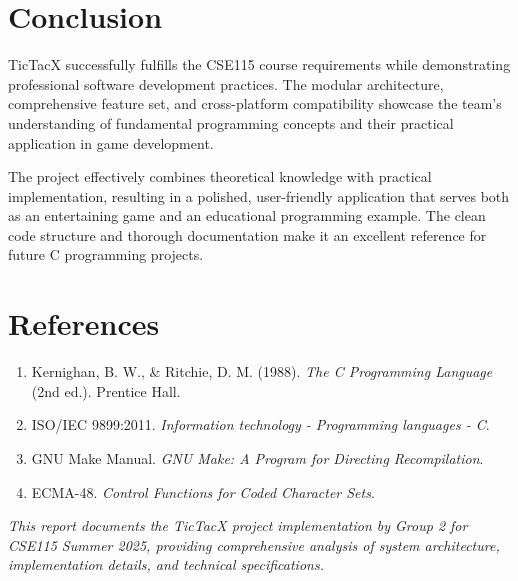 \documentclass[12pt]{article}
\begin{document}
\section{Conclusion}

TicTacX successfully fulfills the CSE115 course requirements while demonstrating professional software development practices. The modular architecture, comprehensive feature set, and cross-platform compatibility showcase the team's understanding of fundamental programming concepts and their practical application in game development.

The project effectively combines theoretical knowledge with practical implementation, resulting in a polished, user-friendly application that serves both as an entertaining game and an educational programming example. The clean code structure and thorough documentation make it an excellent reference for future C programming projects.

\section{References}

\begin{enumerate}
    \item Kernighan, B. W., \& Ritchie, D. M. (1988). \textit{The C Programming Language} (2nd ed.). Prentice Hall.
    \item ISO/IEC 9899:2011. \textit{Information technology - Programming languages - C}.
    \item GNU Make Manual. \textit{GNU Make: A Program for Directing Recompilation}.
    \item ECMA-48. \textit{Control Functions for Coded Character Sets}.
\end{enumerate}

\vfill
\textit{This report documents the TicTacX project implementation by Group 2 for CSE115 Summer 2025, providing comprehensive analysis of system architecture, implementation details, and technical specifications.}
\end{document}

